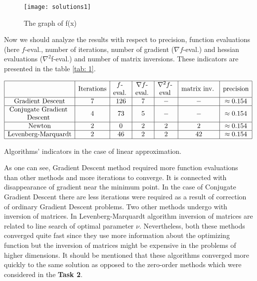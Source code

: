 \documentclass[12pt, bachelor, substylefile = algo_title.rtx]{disser}
\makeatletter
\newcommand{\specialcell}[2][c]{%
  \begin{tabular}[#1]{@{}c@{}}#2\end{tabular}}
\theoremstyle{definition}
\makeatother
\begin{document}
\begin{figure}[h]
\begin{center}
\texttt{[image: solutions1]}
\caption{The graph of f(x)}
\label{fig: 2}
\end{center}
\end{figure}

Now we should analyze the results with respect to precision, function evaluations (here $f$-eval., number of iterations, number of gradient ($\nabla f$-eval.) and hessian evaluations ($\nabla^2 $f-eval.) and number of matrix inversions. These indicators are presented in the table \ref{tab: 1}.

\begin{table}[h]
$$
\begin{array}{|c|c|c|c|c|c|c|}
\hline
 & \text{Iterations} & \text{\specialcell{ $f$-\\eval.} }& \text{\specialcell{ $\nabla f$-\\eval.} } & \text{\specialcell{ $\nabla^2 f$-\\eval} } & \text{\specialcell{ matrix inv. } } &\text{precision}\\
\hline
\text{Gradient Descent} & 7 & 126 & 7 & - & - & \approx 0.154 \\ 
\hline
\text{\specialcell{ Conjugate Gradient\\ Descent } } & 4 & 73 & 5 & - & - &\approx 0.154 \\
\hline
\text{Newton} & 2 & 0 & 2 & 2& 2 & \approx 0.154 \\
\hline
\text{Levenberg-Marquardt} & 2 & 46 & 2 & 2 & 42 & \approx 0.154 \\
\hline
\end{array}
$$
\caption{Algorithms' indicators in the case of linear approximation.}
\label{tab: 1}
\end{table}

As one can see, Gradient Descent method required more function evaluations than other methods and more iterations to converge. It is connected with disappearance of gradient near the minimum point. In the case of Conjugate Gradient Descent there are less iterations were required as a result of correction of ordinary Gradient Descent problems. Two other methods undergo with inversion of matrices. In Levenberg-Marquardt algorithm inversion of matrices are related to line search of optimal parameter $\nu$. Nevertheless, both these methods converged quite fast since they use more information about the optimizing function but the inversion of matrices might be expensive in the problems of higher dimensions. It should be mentioned that these algorithms converged more quickly to the same solution as opposed to the zero-order methods which were considered in the \textbf{Task 2}.
\end{document}
